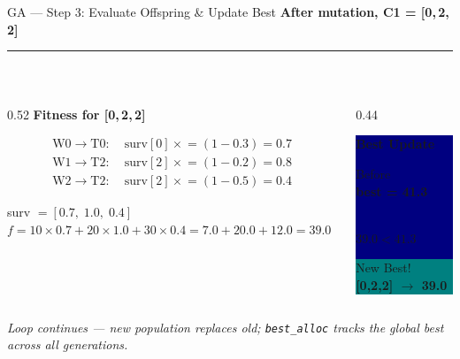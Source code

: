 \documentclass[aspectratio=169]{beamer}
\newcommand{\sectionbar}{%
  {\color{teal}\rule{\linewidth}{0.4pt}}\\[2pt]}
\begin{document}
\begin{frame}{GA --- Step 3: Evaluate Offspring \& Update Best}
  {\bfseries\color{navy} After mutation, C1 = [0,\,2,\,2]}\\
  \sectionbar

  \begin{columns}[T]
    \begin{column}{0.52\textwidth}
      \colorbox{navymid}{\color{teallt}\bfseries\small
        Fitness for [0,\,2,\,2]}
      \vspace{4pt}

      {\small
      \begin{align*}
        \text{W0}\!\to\!\text{T0}:&\;
          \text{surv}[0] \mathrel{\times}= (1-0.3) = 0.7 \\
        \text{W1}\!\to\!\text{T2}:&\;
          \text{surv}[2] \mathrel{\times}= (1-0.2) = 0.8 \\
        \text{W2}\!\to\!\text{T2}:&\;
          \text{surv}[2] \mathrel{\times}= (1-0.5) = 0.4
      \end{align*}}

      {\small surv $= [0.7,\;1.0,\;0.4]$}\\[4pt]
      {\small $f = 10{\times}0.7 + 20{\times}1.0 + 30{\times}0.4
        = 7.0+20.0+12.0 = \mathbf{39.0}$}
    \end{column}

    \begin{column}{0.44\textwidth}
      \colorbox{navy}{\begin{minipage}{\linewidth}
        \vspace{0.2cm}\centering
        {\color{teal}\bfseries Best Update}\\[0.15cm]
        \colorbox{navymid}{\begin{minipage}{0.9\linewidth}\centering
          {\color{mygray}\small Before}\\
          {\color{white}\bfseries best = 41.3}
        \end{minipage}}\\[0.15cm]
        {\color{amber}\bfseries $39.0 < 41.3$ \checkmark}\\[0.15cm]
        \colorbox{teal}{\begin{minipage}{0.9\linewidth}\centering
          {\color{white}\small New Best!}\\
          {\color{white}\bfseries [0,2,2] $\to$ 39.0}
        \end{minipage}}
        \vspace{0.2cm}
      \end{minipage}}
    \end{column}
  \end{columns}

  \vspace{0.25cm}
  \colorbox{navymid}{\begin{minipage}{\linewidth}
    {\color{teallt}\small\itshape
     Loop continues --- new population replaces old;
     \texttt{best\_alloc} tracks the global best across all generations.}
  \end{minipage}}
\end{frame}
\end{document}
